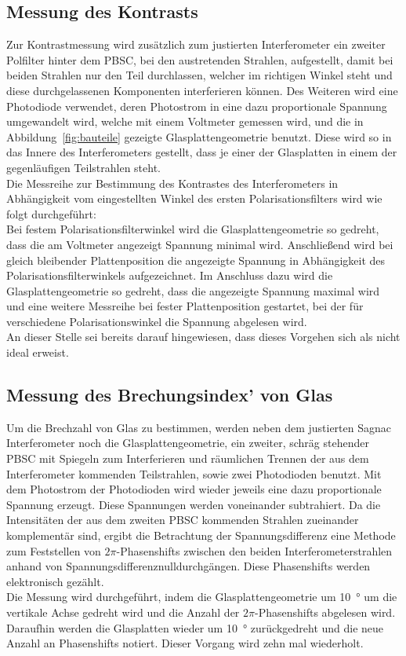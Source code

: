 \subsection{Messung des Kontrasts}
%
Zur Kontrastmessung wird zusätzlich zum justierten Interferometer 
ein zweiter Polfilter hinter dem PBSC, bei den austretenden Strahlen, 
aufgestellt, damit bei beiden Strahlen nur den Teil durchlassen, 
welcher im richtigen Winkel steht und diese durchgelassenen 
Komponenten interferieren können. Des Weiteren wird eine 
Photodiode verwendet, deren Photostrom in eine dazu proportionale 
Spannung umgewandelt wird, welche mit einem Voltmeter gemessen wird, und 
die in Abbildung~\ref{fig:bauteile} gezeigte Glasplattengeometrie 
benutzt. Diese wird so in das Innere des Interferometers gestellt, 
dass je einer der Glasplatten in einem der gegenläufigen Teilstrahlen 
steht.\\
Die Messreihe zur Bestimmung des Kontrastes des Interferometers 
in Abhängigkeit vom eingestellten Winkel des ersten 
Polarisationsfilters wird wie folgt durchgeführt:\\
Bei festem Polarisationsfilterwinkel wird die Glasplattengeometrie 
so gedreht, dass die am Voltmeter angezeigt Spannung minimal wird. 
Anschließend wird bei gleich bleibender Plattenposition die 
angezeigte Spannung in Abhängigkeit des Polarisationsfilterwinkels 
aufgezeichnet.
Im Anschluss dazu wird die Glasplattengeometrie so gedreht, dass 
die angezeigte Spannung maximal wird und eine weitere 
Messreihe bei fester Plattenposition gestartet, bei der für 
verschiedene Polarisationswinkel die Spannung abgelesen wird.\\
An dieser Stelle sei bereits darauf hingewiesen, dass dieses Vorgehen 
sich als nicht ideal erweist.
%
\subsection{Messung des Brechungsindex' von Glas}
%
Um die Brechzahl von Glas zu bestimmen, werden neben dem 
justierten Sagnac Interferometer noch die Glasplattengeometrie, 
ein zweiter, schräg stehender PBSC mit Spiegeln zum Interferieren und 
räumlichen Trennen der aus dem Interferometer kommenden Teilstrahlen, 
sowie zwei Photodioden benutzt. Mit dem Photostrom der 
Photodioden wird wieder jeweils eine dazu proportionale 
Spannung erzeugt. Diese Spannungen werden voneinander subtrahiert. 
Da die Intensitäten der aus dem zweiten 
PBSC kommenden Strahlen zueinander komplementär sind, ergibt die 
Betrachtung der Spannungsdifferenz eine Methode zum Feststellen von 
$2\pi$-Phasenshifts zwischen den beiden Interferometerstrahlen anhand 
von Spannungsdifferenznulldurchgängen. Diese Phasenshifts werden 
elektronisch gezählt.\\
Die Messung wird durchgeführt, indem die Glasplattengeometrie um 
\SI{10}{\degree} um die vertikale Achse gedreht wird und die Anzahl 
der $2\pi$-Phasenshifts abgelesen wird. Daraufhin werden die 
Glasplatten wieder um \SI{10}{\degree} zurückgedreht und die neue 
Anzahl an Phasenshifts notiert. Dieser Vorgang wird zehn mal 
wiederholt.
%
